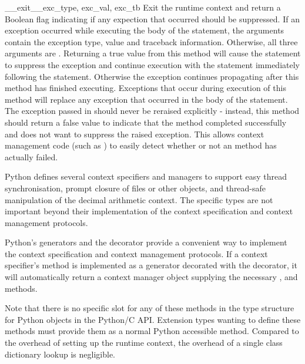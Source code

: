 \begin{methoddesc}{__exit__}{exc_type, exc_val, exc_tb}
  Exit the runtime context and return a Boolean flag indicating if any
  expection that occurred should be suppressed. If an exception
  occurred while executing the body of the  statement, the
  arguments contain the exception type, value and traceback information.
  Otherwise, all three arguments are .
  Returning a true value from this method will cause the 
  statement to suppress the exception and continue execution with the
  statement immediately following the  statement. Otherwise
  the exception continues propagating after this method has finished
  executing. Exceptions that occur during execution of this method will
  replace any exception that occurred in the body of the 
  statement.
  The exception passed in should never be reraised explicitly - instead,
  this method should return a false value to indicate that the method
  completed successfully and does not want to suppress the raised
  exception. This allows context management code (such as
  ) to easily detect whether or not an
   method has actually failed.
\end{methoddesc}

Python defines several context specifiers and managers to support
easy thread synchronisation, prompt closure of files or other
objects, and thread-safe manipulation of the decimal arithmetic
context. The specific types are not important beyond their
implementation of the context specification and context
management protocols.

Python's generators and the 
decorator provide a convenient way to implement the context
specification and context management protocols.  If a context
specifier's  method is implemented as a
generator decorated with the 
decorator, it will automatically return a context manager
object supplying the necessary ,
 and  methods.

Note that there is no specific slot for any of these methods in the
type structure for Python objects in the Python/C API. Extension
types wanting to define these methods must provide them as a normal
Python accessible method. Compared to the overhead of setting up the
runtime context, the overhead of a single class dictionary lookup
is negligible.



